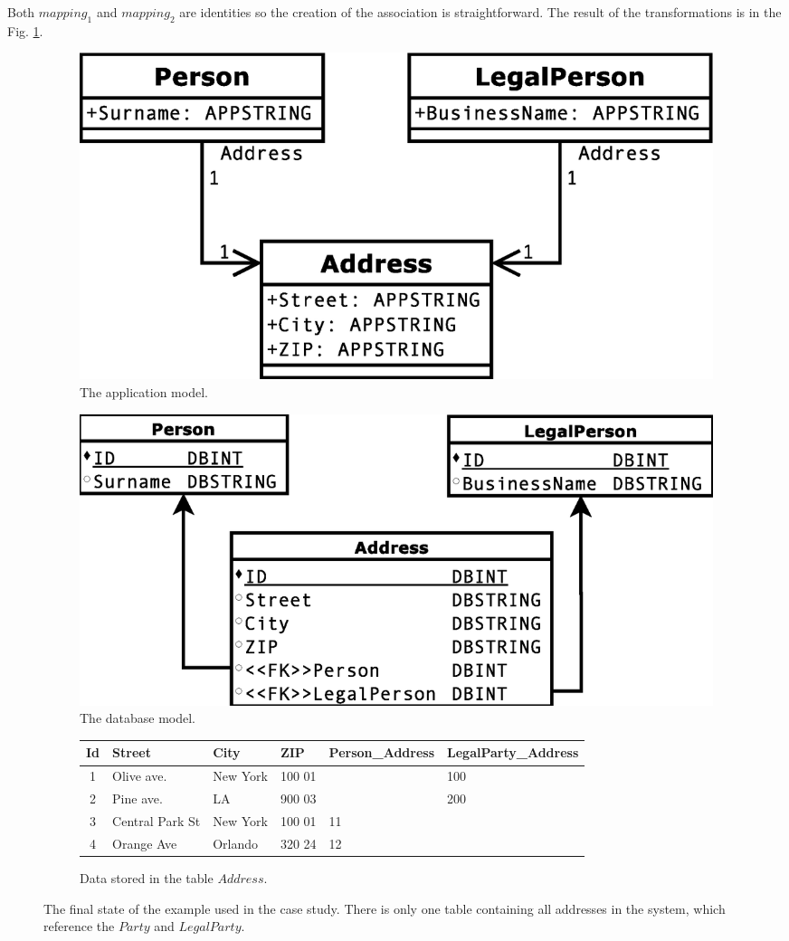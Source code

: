 \documentclass[runningheads]{comsis}
\begin{document}
Both $mapping_1$ and $mapping_2$ are identities so the creation of the association is straightforward. The result of the transformations is in the Fig. \ref{fig:case2}. 
\begin{figure}
\begin{subfigure}[b]{0.45\textwidth}
	\centering
	\includegraphics[width=\textwidth]{./images/case_app_9}
	\caption{The application model.}
\end{subfigure}
\quad
\begin{subfigure}[b]{0.45\textwidth}
	\centering
	\includegraphics[width=\textwidth]{./images/case_db_8}
	\caption{The database model.}
\end{subfigure}
\begin{subfigure}[b]{\textwidth}
	\centering
	\begin{tabular}{| c | l | l | l | l | l |}
	 	\hline
		Id & Street & City & ZIP & Person\_Address & LegalParty\_Address\\ \hline  
		1 & Olive ave. & New York & 100 01 & & 100 \\ \hline
		2 & Pine ave. & LA & 900 03 & & 200  \\ \hline
		3 & Central Park St & New York & 100 01 & 11 &  \\ \hline
		4 & Orange Ave & Orlando & 320 24 & 12 &\\ \hline
	\end{tabular}
	\caption{Data stored in the table $Address$.}
\end{subfigure}
	\caption{The final state of the example used in the case study. There is only one table containing all addresses in the system, which reference the $Party$ and $LegalParty$.}
	\label{fig:case2}
\end{figure}
\end{document}
